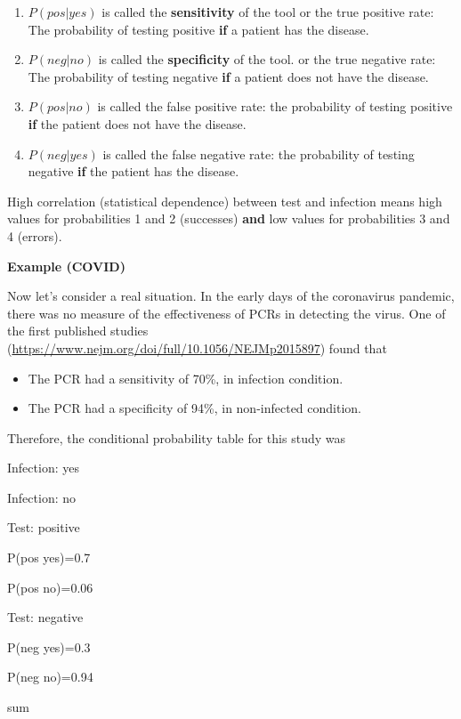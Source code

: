 \documentclass[
]{book}
\providecommand{\tightlist}{%
  \setlength{\itemsep}{0pt}\setlength{\parskip}{0pt}}
\begin{document}
\begin{enumerate}
\def\labelenumi{\arabic{enumi})}
\item
  \(P(pos| yes)\) is called the \textbf{sensitivity} of the tool or the true positive rate: The probability of testing positive \textbf{if} a patient has the disease.
\item
  \(P(neg| no)\) is called the \textbf{specificity} of the tool. or the true negative rate: The probability of testing negative \textbf{if} a patient does not have the disease.
\item
  \(P(pos| no)\) is called the false positive rate: the probability of testing positive \textbf{if} the patient does not have the disease.
\item
  \(P(neg| yes)\) is called the false negative rate: the probability of testing negative \textbf{if} the patient has the disease.
\end{enumerate}

High correlation (statistical dependence) between test and infection means high values for probabilities 1 and 2 (successes) \textbf{and} low values for probabilities 3 and 4 (errors).

\textbf{Example (COVID)}

Now let's consider a real situation. In the early days of the coronavirus pandemic, there was no measure of the effectiveness of PCRs in detecting the virus. One of the first published studies (\url{https://www.nejm.org/doi/full/10.1056/NEJMp2015897}) found that

\begin{itemize}
\tightlist
\item
  The PCR had a sensitivity of 70\%, in infection condition.
\item
  The PCR had a specificity of 94\%, in non-infected condition.
\end{itemize}

Therefore, the conditional probability table for this study was

Infection: yes

Infection: no

Test: positive

P(pos {\textbar{}} yes)=0.7

P(pos {\textbar{}} no)=0.06

Test: negative

P(neg {\textbar{}} yes)=0.3

P(neg {\textbar{}} no)=0.94

sum
\end{document}
